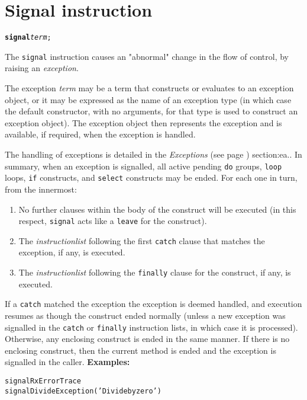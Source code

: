 \chapter{Signal instruction}\label{refsignal}
\index{,}
\index{,}
\begin{shaded}
\begin{alltt}
\textbf{signal} \emph{term};
\end{alltt}
\end{shaded}
 The \texttt{signal} instruction causes an "abnormal" change
in the flow of control, by raising an \emph{exception}.
 
The exception \emph{term} may be a term that constructs or evaluates
to an exception object, or it may be expressed as the name of an
exception type (in which case the default constructor, with no
arguments, for that type is used to construct an exception object).
The exception object then represents the exception and is available, if
required, when the exception is handled.
 
The handling of exceptions is detailed in the
 \emph{Exceptions} (see page \pageref{refexcep}) 
section:ea..
In summary, when an exception is signalled, all active pending
\texttt{do} groups, \texttt{loop} loops, \texttt{if} constructs, and
\texttt{select} constructs may be ended.
For each one in turn, from the innermost:
\begin{enumerate}
\item No further clauses within the body of the construct will be executed
(in this respect, \texttt{signal} acts like a \texttt{leave} for the
construct).
\item The \emph{instructionlist} following the first \texttt{catch}
clause that matches the exception, if any, is executed.
\item The \emph{instructionlist} following the \texttt{finally}
clause for the construct, if any, is executed.
\end{enumerate}
If a \texttt{catch} matched the exception the exception is deemed
handled, and execution resumes as though the construct ended normally
(unless a new exception was signalled in the \texttt{catch} or
\texttt{finally} instruction lists, in which case it is processed).
Otherwise, any enclosing construct is ended in the same manner.
If there is no enclosing construct, then the current method is ended and
the exception is signalled in the caller.
 \textbf{Examples:}
\begin{alltt}
signal RxErrorTrace
signal DivideException('Divide by zero')
\end{alltt}

